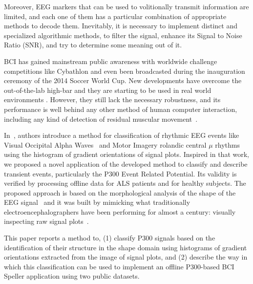 \documentclass[entropy,article,submit,moreauthors,pdftex,10pt,a4paper]{mdpi}
\begin{document}
Moreover, EEG markers \citep{Clerc} that can be used to volitionally transmit information are limited, and each one of them has a particular combination of appropriate methods to decode them. Inevitably, it is necessary to implement  distinct and specialized algorithmic methods, to filter the signal, enhance its Signal to Noise Ratio (SNR), and try to determine some meaning out of it.  



BCI has gained mainstream public awareness with worldwide challenge competitions like Cybathlon  \citep{Riener2014} and even been broadcasted during the inauguration ceremony of the 2014 Soccer World Cup.  New developments have overcome the out-of-the-lab high-bar and they are starting to be used in real world environments \citep{Huggins2016}.  However, they still lack the necessary robustness, and its performance is well behind any other method of human computer interaction, including any kind of detection of residual muscular movement~\citep{Clerc}.

In~\citep{Ramele2016},  authors introduce a method for classification of rhythmic EEG events like Visual Occipital Alpha Waves~\citep{Ben-Simon2013}  and Motor Imagery rolandic central $\mu$ rhythms~\citep{Hartman2005} using the histogram of gradient orientations of signal plots. Inspired in that work, we proposed a novel application of the developed method to classify and describe transient events, particularly the P300 Event Related Potential.  Its validity is verified by processing offline data for ALS patients and for healthy subjects. 
The proposed approach is based on the morphological analysis of the shape of the EEG signal~\citep{Alvarado-Gonzalez2016,Yamaguchi2009} and it was built by mimicking what traditionally electroencephalographers have been performing for almost a century: visually inspecting raw signal plots~\citep{Hartman2005}.

This paper reports a method to, (1) classify P300 signals based on the identification of their structure in the shape domain using histograms of gradient orientations extracted from the image of signal plots, and (2) describe the way in which this classification can be used to implement an offline P300-based BCI Speller application using two public datasets.
\end{document}
